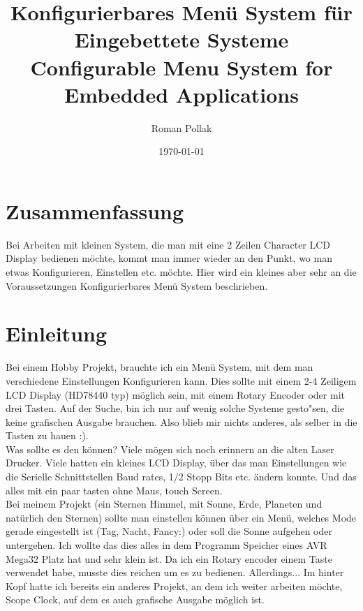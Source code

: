 \documentclass[a4paper]{article}
\begin{document}
\lstset{language=C}
\title{\Huge{Konfigurierbares Men\"u System für Eingebettete Systeme\\
Configurable Menu System for Embedded Applications}} 
\author{Roman Pollak}
\date{\today}
\maketitle
\newpage

\section{Zusammenfassung}
Bei Arbeiten mit kleinen System, die man mit eine 2 Zeilen Character LCD Display bedienen möchte, kommt man immer wieder an den Punkt, wo man etwas Konfigurieren, Einstellen etc. möchte. Hier wird ein kleines aber sehr an die Voraussetzungen Konfigurierbares Menü System beschrieben.\\


\section{Einleitung}
Bei einem Hobby Projekt, brauchte ich ein Menü System, mit dem man verschiedene Einstellungen Konfigurieren kann.
Dies sollte mit einem 2-4 Zeiligem LCD Display (HD78440 typ) möglich sein, mit einem Rotary Encoder oder mit drei Tasten.
Auf der Suche, bin ich nur auf wenig solche Systeme gesto"sen, die keine grafischen Ausgabe brauchen. Also blieb mir nichts anderes, als selber in die Tasten zu hauen :). \\
Was sollte es den können? Viele mögen sich noch erinnern an die alten Laser Drucker. Viele hatten ein kleines LCD Display, über das man Einstellungen wie die Serielle Schnittstellen Baud rates, 1/2 Stopp Bits etc. ändern konnte. Und das alles mit ein paar tasten ohne Maus, touch Screen.\\
Bei meinem Projekt (ein Sternen Himmel, mit Sonne, Erde, Planeten und natürlich den Sternen) sollte man einstellen können über ein Menü, welches Mode gerade eingestellt ist (Tag, Nacht, Fancy:) oder soll die Sonne aufgehen oder untergehen. Ich wollte das dies alles in dem Programm Speicher eines AVR Mega32 Platz hat und sehr klein ist. Da ich ein Rotary encoder einem Taste verwendet habe, musste dies reichen um es zu bedienen. Allerdings... Im hinter Kopf hatte ich bereits ein anderes Projekt, an dem ich weiter arbeiten möchte, Scope Clock, auf dem es auch grafische Ausgabe möglich ist.\\
\end{document}
